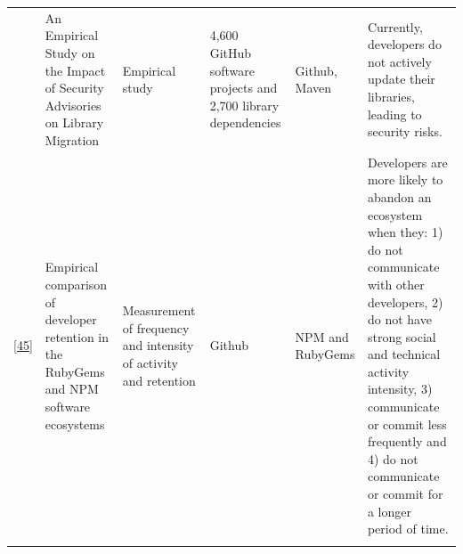 \documentclass[]{book}
\begin{document}
\begin{longtable}[]{@{}llllll@{}}
\begin{minipage}[t]{0.10\columnwidth}
\end{minipage} & \begin{minipage}[t]{0.18\columnwidth}\raggedright\strut
An Empirical Study on the Impact of Security Advisories on Library
Migration\strut
\end{minipage} & \begin{minipage}[t]{0.19\columnwidth}\raggedright\strut
Empirical study\strut
\end{minipage} & \begin{minipage}[t]{0.11\columnwidth}\raggedright\strut
4,600 GitHub software projects and 2,700 library dependencies\strut
\end{minipage} & \begin{minipage}[t]{0.13\columnwidth}\raggedright\strut
Github, Maven\strut
\end{minipage} & \begin{minipage}[t]{0.11\columnwidth}\raggedright\strut
Currently, developers do not actively update their libraries, leading to
security risks.\strut
\end{minipage}\tabularnewline
\begin{minipage}[t]{0.10\columnwidth}\raggedright\strut
{[}\protect\hyperlink{ref-Constantinou2017}{45}{]}\strut
\end{minipage} & \begin{minipage}[t]{0.18\columnwidth}\raggedright\strut
Empirical comparison of developer retention in the RubyGems and NPM
software ecosystems\strut
\end{minipage} & \begin{minipage}[t]{0.19\columnwidth}\raggedright\strut
Measurement of frequency and intensity of activity and retention\strut
\end{minipage} & \begin{minipage}[t]{0.11\columnwidth}\raggedright\strut
Github\strut
\end{minipage} & \begin{minipage}[t]{0.13\columnwidth}\raggedright\strut
NPM and RubyGems\strut
\end{minipage} & \begin{minipage}[t]{0.11\columnwidth}\raggedright\strut
Developers are more likely to abandon an ecosystem when they: 1) do not
communicate with other developers, 2) do not have strong social and
technical activity intensity, 3) communicate or commit less frequently
and 4) do not communicate or commit for a longer period of time.\strut
\end{minipage}\tabularnewline
\begin{minipage}[t]{0.10\columnwidth}\raggedright\strut

\end{minipage}
\end{longtable}
\end{document}
